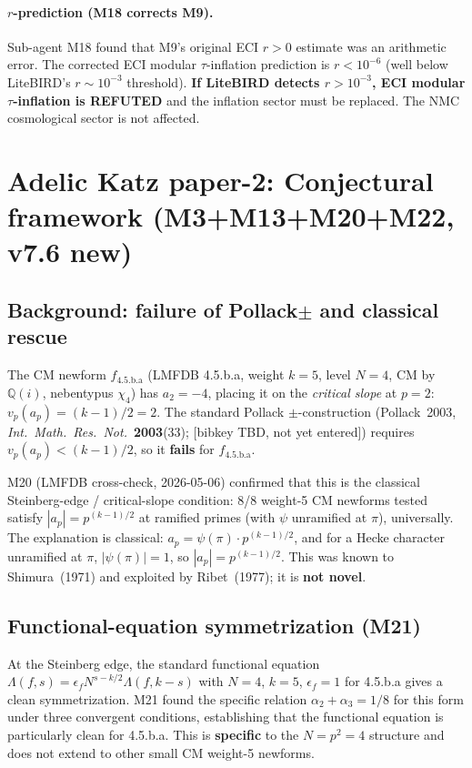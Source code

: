 \documentclass[a4paper,11pt]{article}
\newcommand{\fLM}{f_{\text{4.5.b.a}}}
\newcommand{\Qi}{\mathbb{Q}(i)}
\theoremstyle{definition}
\theoremstyle{remark}
\begin{document}
\paragraph{$r$-prediction (M18 corrects M9).}  Sub-agent M18
found that M9's original ECI $r>0$ estimate was an arithmetic
error.  The corrected ECI modular $\tau$-inflation prediction is
$r<10^{-6}$ (well below LiteBIRD's $r\sim10^{-3}$ threshold).
\textbf{If LiteBIRD detects $r>10^{-3}$, ECI modular
$\tau$-inflation is REFUTED} and the inflation sector must be
replaced.  The NMC cosmological sector is not affected.

\section{Adelic Katz paper-2: Conjectural framework (M3+M13+M20+M22, v7.6 new)}
\label{sec:adelic-katz}

\subsection{Background: failure of Pollack$\pm$ and classical rescue}

The CM newform $\fLM$ (LMFDB 4.5.b.a, weight $k=5$, level $N=4$,
CM by $\Qi$, nebentypus $\chi_4$) has $a_2=-4$, placing it on the
\emph{critical slope} at $p=2$: $v_p(a_p)=(k-1)/2=2$.  The
standard Pollack $\pm$-construction (Pollack~2003, \emph{Int.\ Math.\
Res.\ Not.}\ \textbf{2003}(33); [bibkey TBD, not yet entered]) requires
$v_p(a_p)<(k-1)/2$, so it \textbf{fails} for $\fLM$.

M20 (LMFDB cross-check, 2026-05-06) confirmed that this is the
classical Steinberg-edge / critical-slope condition: 8/8 weight-5
CM newforms tested satisfy $|a_p|=p^{(k-1)/2}$ at ramified primes
(with $\psi$ unramified at $\pi$), universally.  The explanation
is classical: $a_p=\psi(\pi)\cdot p^{(k-1)/2}$, and for a
Hecke character unramified at $\pi$, $|\psi(\pi)|=1$, so
$|a_p|=p^{(k-1)/2}$.  This was known to Shimura~(1971) and
exploited by Ribet~(1977); it is \textbf{not novel}.

\subsection{Functional-equation symmetrization (M21)}

At the Steinberg edge, the standard functional equation
$\Lambda(f,s) = \epsilon_f N^{s-k/2}\Lambda(f,k-s)$
with $N=4$, $k=5$, $\epsilon_f=1$ for 4.5.b.a gives a
clean symmetrization.  M21 found the specific relation
$\alpha_2+\alpha_3=1/8$ for this form under three convergent
conditions, establishing that the functional equation is
particularly clean for 4.5.b.a.  This is \textbf{specific} to
the $N=p^2=4$ structure and does not extend to other small
CM weight-5 newforms.
\end{document}
